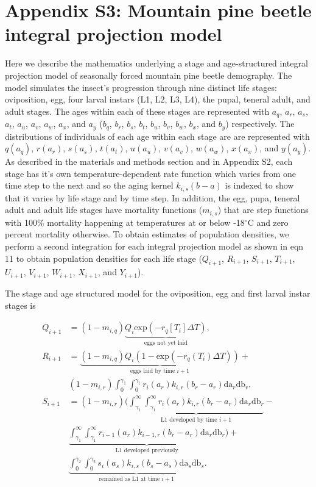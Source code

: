 \documentclass[12pt]{article}
\begin{document}
\section*{Appendix S3: Mountain pine beetle integral projection model}

\FloatBarrier

Here we describe the mathematics underlying a stage and age-structured integral projection model of seasonally forced mountain pine beetle demography. The model simulates the insect's progression through nine distinct life stages: oviposition, egg, four larval instars (L1, L2, L3, L4), the pupal, teneral adult, and adult stages. The ages within each of these stages are represented with $a_q$, $a_r$, $a_s$, $a_t$, $a_u$, $a_v$, $a_w$, $a_x$, and $a_y$ ($b_q$, $b_r$, $b_s$, $b_t$, $b_u$, $b_v$, $b_w$, $b_x$, and $b_y$) respectively. The distributions of individuals of each age within each stage are are represented with $q(a_q)$, $r(a_r)$, $s(a_s)$, $t(a_t)$, $u(a_u)$, $v(a_v)$, $w(a_w)$, $x(a_x)$, and $y(a_y)$. As described in the materials and methods section and in Appendix S2, each stage has it's own temperature-dependent rate function which varies from one time step to the next and so the aging kernel $k_{i,s}(b - a)$ is indexed to show that it varies by life stage and by time step. In addition, the egg, pupa, teneral adult and adult life stages have mortality functions ($m_{i,s}$) that are step functions with 100\% mortality happening at temperatures at or below -18$^\circ$C and zero percent mortality otherwise. To obtain estimates of population densities, we perform a second integration for each integral projection model as shown in eqn 11 to obtain population densities for each life stage ($Q_{i+1}$, $R_{i+1}$, $S_{i+1}$, $T_{i+1}$, $U_{i+1}$, $V_{i+1}$, $W_{i+1}$, $X_{i+1}$, and $Y_{i+1}$).

The stage and age structured model for the oviposition, egg and first larval instar stages is

\begin{align*}
Q_{i+1} &= (1 - m_{i,q})\underbrace{Q_{i}\text{exp}(-r_q[T_i]\Delta T)}_{\text{eggs not yet laid}}, \tag{eqn A4.1a}\\
R_{i+1} &= \underbrace{(1 - m_{i,q})Q_{i}(1 - \text{exp}(-r_q(T_i)\Delta T))}_{\text{eggs laid by time $i+1$}} +\\
& (1 - m_{i,r})\int_0^{\gamma_1}\int_0^{\gamma_1} r_i(a_r)k_{i,r}(b_r - a_r)\text{da}_r\text{db}_r, \tag{eqn A4.1b}\\
S_{i+1} &= (1 - m_{i,r})\bigg(\underbrace{\int_{\gamma_1}^{\infty}\int_{\gamma_1}^{\infty} r_i(a_r)k_{i,r}(b_r - a_r)\text{da}_r\text{db}_r}_{\text{L1 developed by time $i+1$}} -\\
& \underbrace{\int_{\gamma_1}^{\infty}\int_{\gamma_1}^{\infty} r_{i-1}(a_r)k_{i-1,r}(b_r - a_r)\text{da}_r\text{db}_r}_{\text{L1 developed previously}}\bigg)+\\
& \underbrace{\int_0^{\gamma_2} \int_0^{\gamma_2} s_i(a_s)k_{i,s}(b_s - a_s)\text{da}_s\text{db}_s}_{\text{remained as L1 at time $i+1$}}. \tag{eqn A4.1c}
\end{align*}
\end{document}
